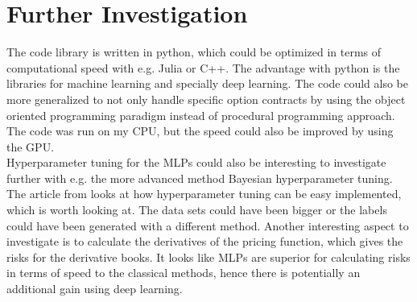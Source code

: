 \section{Further Investigation}
The code library is written in python, which could be optimized in terms of computational speed with e.g. Julia or C++. The advantage with python is the libraries for machine learning and specially deep learning. The code could also be more generalized to not only handle specific option contracts by using the object oriented programming paradigm instead of procedural programming approach. The code was run on my CPU, but the speed could also be improved by using the GPU.\\

Hyperparameter tuning for the MLPs could also be interesting to investigate further with e.g. the more advanced method Bayesian hyperparameter tuning. The article from \parencite{liaw2018tune} looks at how hyperparameter tuning can be easy implemented, which is worth looking at. The data sets could have been bigger or the labels could have been generated with a different method. Another interesting aspect to investigate is to calculate the derivatives of the pricing function, which gives the risks for the derivative books. It looks like MLPs are superior for calculating risks in terms of speed to the classical methods, hence there is potentially an additional gain using deep learning.\\


